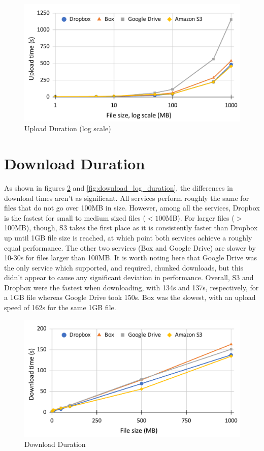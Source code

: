 \begin{figure} [!h]
    \centering
    \includegraphics[scale=0.6]{images/upload_log_chart}
    \caption{\label{fig:upload_log_duration}Upload Duration (log scale)}
\end{figure}

\section{Download Duration}
As shown in figures \ref{fig:download_duration} and \ref{fig:download_log_duration}, the differences in download times aren't as significant. All services perform roughly the same for files that do not go over 100MB in size. However, among all the services, Dropbox is the fastest for small to medium sized files ($< 100$MB). For larger files ($ >$100MB), though, S3 takes the first place as it is consistently faster than Dropbox up until 1GB file size is reached, at which point both services achieve a roughly equal performance. The other two services (Box and Google Drive) are slower by 10-30s for files larger than 100MB. It is worth noting here that Google Drive was the only service which supported, and required, chunked downloads, but this didn't appear to cause any significant deviation in performance. Overall, S3 and Dropbox were the fastest when downloading, with 134s and 137s, respectively, for a 1GB file whereas Google Drive took 150s. Box was the slowest, with an upload speed of 162s for the same 1GB file.

\begin{figure} [!h]
    \centering
    \includegraphics[scale=0.6]{images/download_chart}
    \caption{\label{fig:download_duration}Download Duration}
\end{figure}

